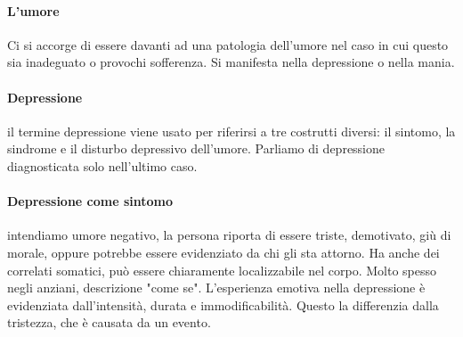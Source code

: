 {\paragraph{L'umore}  Ci si accorge di essere davanti ad una patologia dell'umore nel caso in cui questo sia inadeguato o provochi sofferenza. Si manifesta nella depressione o nella mania.
\paragraph{Depressione}  il termine depressione viene usato per riferirsi a tre costrutti diversi: il sintomo, la sindrome e il disturbo depressivo dell'umore. Parliamo di depressione diagnosticata solo nell'ultimo caso. 
\paragraph{Depressione come sintomo}  intendiamo umore negativo, la persona riporta di essere triste, demotivato, giù di morale, oppure potrebbe essere evidenziato da chi gli sta attorno. Ha anche dei correlati somatici, può essere chiaramente localizzabile nel corpo. Molto spesso negli anziani, descrizione "come se". L'esperienza emotiva nella depressione è evidenziata dall'intensità, durata e immodificabilità. Questo la differenzia dalla tristezza, che è causata da un evento.
}
